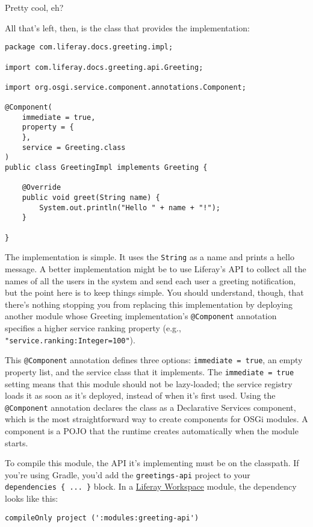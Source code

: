 Pretty cool, eh?

All that's left, then, is the class that provides the implementation:

\begin{verbatim}
package com.liferay.docs.greeting.impl;

import com.liferay.docs.greeting.api.Greeting;

import org.osgi.service.component.annotations.Component;

@Component(
    immediate = true,
    property = {
    },
    service = Greeting.class
)
public class GreetingImpl implements Greeting {

    @Override
    public void greet(String name) {
        System.out.println("Hello " + name + "!");
    }

}
\end{verbatim}

The implementation is simple. It uses the \texttt{String} as a name and
prints a hello message. A better implementation might be to use
Liferay's API to collect all the names of all the users in the system
and send each user a greeting notification, but the point here is to
keep things simple. You should understand, though, that there's nothing
stopping you from replacing this implementation by deploying another
module whose Greeting implementation's \texttt{@Component} annotation
specifies a higher service ranking property (e.g.,
\texttt{"service.ranking:Integer=100"}).

This \texttt{@Component} annotation defines three options:
\texttt{immediate\ =\ true}, an empty property list, and the service
class that it implements. The \texttt{immediate\ =\ true} setting means
that this module should not be lazy-loaded; the service registry loads
it as soon as it's deployed, instead of when it's first used. Using the
\texttt{@Component} annotation declares the class as a Declarative
Services component, which is the most straightforward way to create
components for OSGi modules. A component is a POJO that the runtime
creates automatically when the module starts.

To compile this module, the API it's implementing must be on the
classpath. If you're using Gradle, you'd add the \texttt{greetings-api}
project to your \texttt{dependencies\ \{\ ...\ \}} block. In a
\href{/docs/7-2/reference/-/knowledge_base/r/liferay-workspace}{Liferay
Workspace} module, the dependency looks like this:

\begin{verbatim}
compileOnly project (':modules:greeting-api')
\end{verbatim}

